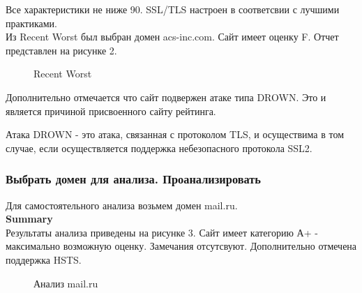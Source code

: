 \documentclass[10pt,a4paper,titlepage]{article}
\begin{document}
Все характеристики не ниже 90. SSL/TLS настроен в соответсвии с лучшими практиками.\\

Из Recent Worst был выбран домен acs-inc.com. Сайт имеет оценку F. Отчет представлен на рисунке 2.

\begin{figure}[!h]	
\caption{Recent Worst}
\label{ris:image2}
\end{figure}

Дополнительно отмечается что сайт подвержен атаке типа DROWN. Это и является причиной присвоенного сайту рейтинга. 

Атака DROWN - это атака, связанная с протоколом TLS, и осуществима в том случае, если осуществляется поддержка небезопасного протокола SSL2.
\subsubsection{Выбрать домен для анализа. Проанализировать}
Для самостоятельного анализа возьмем домен mail.ru.\\

\textbf{Summary}\\
Результаты анализа приведены на рисунке 3. Сайт имеет категорию А+ - максимально возможную оценку. Замечания отсутсвуют. Дополнительно отмечена поддержка HSTS.

\begin{figure}[!h]	
\caption{Анализ mail.ru}
\label{ris:image3}
\end{figure}
\end{document}

